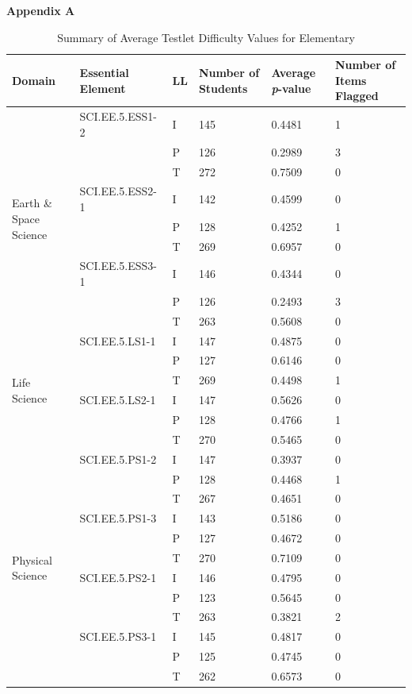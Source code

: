 \documentclass[11.5pt]{sig-alternate} %
\begin{document}
\begin{table}[t]
\large \textbf{Appendix A} \normalsize
\caption*{Summary of Average Testlet Difficulty Values for Elementary}
\begin{tabular}{|l|l|l|l|l|l|}
\hline
Domain & Essential Element & LL & Number of Students & Average \textit{p}-value & Number of Items Flagged \\ \hline
\multirow{9}{*}{Earth \& Space Science} & SCI.EE.5.ESS1-2 & I & 145 & 0.4481 & 1 \\ \cline{2-6}
 & & \cellcolor{yellow}P & \cellcolor{yellow}126 & \cellcolor{yellow}0.2989 & \cellcolor{yellow}3 \\ \cline{2-6}
 & & T & 272 & 0.7509 & 0 \\ \cline{2-6}
 & SCI.EE.5.ESS2-1 & I & 142 & 0.4599 & 0 \\ \cline{2-6}
 & & P & 128 & 0.4252 & 1 \\ \cline{2-6}
 & & T & 269 & 0.6957 & 0 \\ \cline{2-6}
 & SCI.EE.5.ESS3-1 & I & 146 & 0.4344 & 0 \\ \cline{2-6}
 & & \cellcolor{yellow}P & \cellcolor{yellow}126 & \cellcolor{yellow}0.2493 & \cellcolor{yellow}3 \\ \cline{2-6}
 & & T & 263 & 0.5608 & 0 \\ \hline
\multirow{6}{*}{Life Science} & SCI.EE.5.LS1-1 & I & 147 & 0.4875 & 0 \\ \cline{2-6}
 & & P & 127 & 0.6146 & 0 \\ \cline{2-6}
 & & T & 269 & 0.4498 & 1 \\ \cline{2-6}
 & SCI.EE.5.LS2-1 & I & 147 & 0.5626 & 0 \\ \cline{2-6}
 & & P & 128 & 0.4766 & 1 \\ \cline{2-6}
 & & T & 270 & 0.5465 & 0 \\ \hline
\multirow{12}{*}{Physical Science} & SCI.EE.5.PS1-2 & I & 147 & 0.3937 & 0 \\ \cline{2-6}
 & & P & 128 & 0.4468 & 1 \\ \cline{2-6}
 & & T & 267 & 0.4651 & 0 \\ \cline{2-6}
 & SCI.EE.5.PS1-3 & I & 143 & 0.5186 & 0 \\ \cline{2-6}
 & & P & 127 & 0.4672 & 0 \\ \cline{2-6}
 & & T & 270 & 0.7109 & 0 \\ \cline{2-6}
 & SCI.EE.5.PS2-1 & I & 146 & 0.4795 & 0 \\ \cline{2-6}
 & & P & 123 & 0.5645 & 0 \\ \cline{2-6}
 & & T & 263 & 0.3821 & 2 \\ \cline{2-6}
 & SCI.EE.5.PS3-1 & I & 145 & 0.4817 & 0 \\ \cline{2-6}
 & & P & 125 & 0.4745 & 0 \\ \cline{2-6}
 & & T & 262 & 0.6573 & 0 \\ \hline
\end{tabular}
\end{table}
\end{document}
